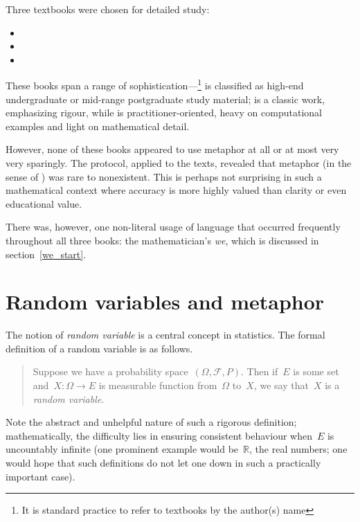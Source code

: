 Three textbooks were chosen for detailed study:

\begin{itemize}
\item {}
\item {}
\item {}
\end{itemize}

These books span a range of
sophistication---\citeauthor{casella2001}\footnote{It is standard
  practice to refer to textbooks by the author(s) name} is classified
as high-end undergraduate or mid-range postgraduate study material;
\citeauthor{feller1968} is a classic work, emphasizing rigour, while
\citeauthor{crawley2015} is practitioner-oriented, heavy on
computational examples and light on mathematical detail.

However, none of these books appeared to use metaphor at all or at
most very very sparingly.  The  protocol, applied
to the texts, revealed that metaphor (in the sense of
) was rare to nonexistent.  This is perhaps not
surprising in such a mathematical context where accuracy is more
highly valued than clarity or even educational value.

There was, however, one non-literal usage of language that occurred
frequently throughout all three books: the mathematician's \emph{we},
which is discussed in section~\ref{we_start}.

\section{Random variables and metaphor}

The notion of \emph{random variable} is a central concept in
statistics.  The formal definition of a random variable is as follows.

\begin{quote}
Suppose we have a probability
space~$\left({\Omega,\mathcal{F},P}\right)$.  Then if~$E$ is some set
and~$X\colon\Omega\longrightarrow E$ is measurable function
from~$\Omega$ to~$X$, we say that~$X$ is a {\em random variable}.
\end{quote}

\noindent
Note the abstract and unhelpful nature of such a rigorous definition;
mathematically, the difficulty lies in ensuring consistent behaviour
when~$E$ is uncountably infinite (one prominent example would
be~$\mathbb{R}$, the real numbers; one would hope that such
definitions do not let one down in such a practically important case).

